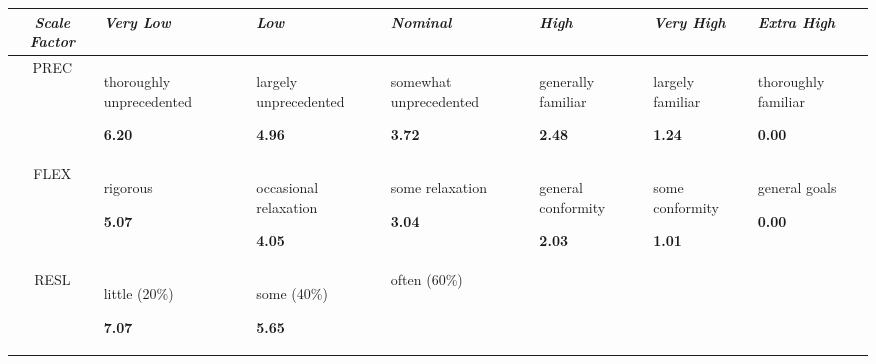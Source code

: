 \noindent \begin{center}
\begin{tabular}{c|>{\centering}p{1.5cm}|>{\centering}p{1.5cm}|>{\centering}p{1.5cm}|>{\centering}p{1.5cm}|>{\centering}p{1.5cm}|>{\centering}p{1.5cm}}
\hline 
\emph{Scale Factor } & \emph{Very Low} & \emph{Low} & \emph{Nominal} & \emph{High} & \emph{Very High} & \emph{Extra High}\tabularnewline
\hline 
\hline 
PREC  & {\small{}thoroughly unprecedented}{\small \par}

\textbf{\small{}6.20} & {\small{}largely unprecedented}{\small \par}

\textbf{\small{}4.96} & {\small{}somewhat unprecedented}{\small \par}

\textbf{\small{}3.72} & {\small{}generally familiar}{\small \par}

\textbf{\small{}2.48} & {\small{}largely familiar}{\small \par}

\textbf{\small{}1.24} & {\small{}thoroughly familiar}{\small \par}

\textbf{\small{}0.00}\tabularnewline
\hline 
FLEX  & {\small{}rigorous}{\small \par}

\textbf{\small{}5.07} & {\small{}occasional relaxation}{\small \par}

\textbf{\small{}4.05} & {\small{}some relaxation}{\small \par}

\textbf{\small{}3.04} & {\small{}general conformity }{\small \par}

\textbf{\small{}2.03} & {\small{}some conformity }{\small \par}

\textbf{\small{}1.01} & {\small{}general goals}{\small \par}

\textbf{\small{}0.00}\tabularnewline
\hline 
RESL & {\small{}little (20\%)}{\small \par}

\textbf{\small{}7.07} & {\small{}some (40\%) }{\small \par}

\textbf{\small{}5.65} & {\small{}often (60\%) }{\small \par}


\end{tabular}
\end{center}
